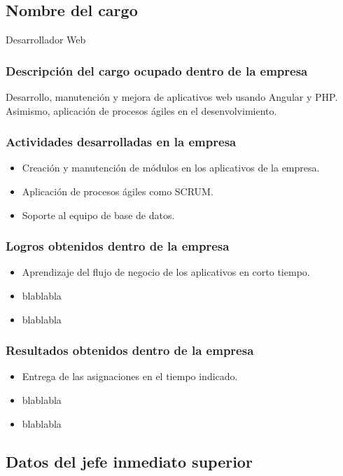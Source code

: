 \subsection{Nombre del cargo}
Desarrollador Web

\subsubsection{Descripción del cargo ocupado dentro de la empresa}
Desarrollo, manutención y mejora de aplicativos web usando Angular y PHP. Asimismo, aplicación de procesos ágiles en el desenvolvimiento.

\subsubsection{Actividades desarrolladas en la empresa} 
\begin{itemize} 
	\item Creación y manutención de módulos en los aplicativos de la empresa.
	\item Aplicación de procesos ágiles como SCRUM.
	\item Soporte al equipo de base de datos.
\end{itemize} 

\subsubsection{Logros obtenidos dentro de la empresa}
\begin{itemize} 
	\item Aprendizaje del flujo de negocio de los aplicativos en corto tiempo.
	\item blablabla
	\item blablabla
\end{itemize}  

\subsubsection{Resultados obtenidos dentro de la empresa} 
\begin{itemize} 
	\item Entrega de las asignaciones en el tiempo indicado.
	\item blablabla
	\item blablabla
\end{itemize} 


\subsection{Datos del jefe inmediato superior}

